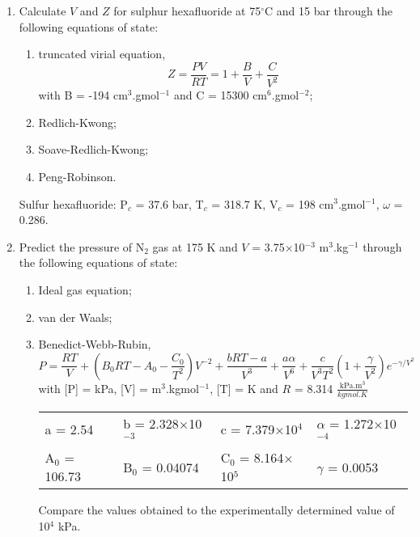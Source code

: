 \documentclass[12pts,a4paper,amsmath,amssymb,floatfix]{article}%
\newcommand{\frc}{\displaystyle\frac}
\begin{document}
\begin{enumerate}[label=\bfseries Problem \arabic*:]
\item\label{Tut03:EOS1} Calculate $V$ and $Z$ for sulphur hexafluoride at 75$^{\circ}$C and 15 bar through the following equations of state:
\begin{enumerate}
\item truncated virial equation,
\begin{displaymath}
Z = \frc{PV}{RT} = 1 + \frc{B}{V} + \frc{C}{V^{2}}
\end{displaymath}
with B = -194 cm$^{3}$.gmol$^{-1}$ and C = 15300 cm$^{6}$.gmol$^{-2}$;
\item Redlich-Kwong;
\item Soave-Redlich-Kwong;
\item Peng-Robinson.
\end{enumerate}
Sulfur hexafluoride: P$_{c}$ = 37.6 bar, T$_{c}$ = 318.7 K, V$_{c}$ = 198 cm$^{3}$.gmol$^{-1}$, $\omega$ = 0.286.

\item\label{Tut03:EOS2}Predict the pressure of N$_{2}$ gas at 175 K and $V$ = 3.75$\times$10$^{-3}$ m$^{3}$.kg$^{-1}$ through the following equations of state:
\begin{enumerate}
\item Ideal gas equation;
\item van der Waals;
\item Benedict-Webb-Rubin,
\begin{displaymath}
P = \frc{R T}{V} + \left(B_{0} R T - A_{0} - \frc{C_{0}}{T^{2}}\right) V^{-2} + \frc{ b R T - a}{V^{3}} + \frc{a \alpha}{V^{6}} + \frc{c}{V^{3}T^{2}}\left(1 + \frc{\gamma}{V^{2}}\right) e^{-\gamma/V^{2}} 
\end{displaymath}
with [P] = kPa, [V] = m$^{3}$.kgmol$^{-1}$, [T] = K and $R$ = 8.314 $\frc{\text{kPa.m}^{3}}{kgmol.K}$ 
\begin{center}
\begin{tabular}{ l l l l }
a = 2.54 & b = 2.328$\times$10$^{-3}$ & c = 7.379$\times$10$^{4}$ & $\alpha$ = 1.272$\times$10$^{-4}$ \\
A$_{0}$ = 106.73 & B$_{0}$ = 0.04074 & C$_{0}$ = 8.164$\times$10$^{5}$ & $\gamma$ = 0.0053 \\ 
\end{tabular}
\end{center}
Compare the values obtained to the experimentally determined value of 10$^{4}$ kPa.
\end{enumerate}


\end{enumerate}



\clearpage

%
\end{document}
